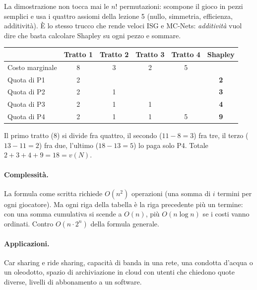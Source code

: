 \begin{osservazione}
La dimostrazione non tocca mai le $n!$ permutazioni: scompone il gioco in pezzi semplici e
usa i quattro assiomi della lezione 5 (nullo, simmetria, efficienza, additività). È lo
stesso trucco che rende veloci ISG e MC-Nets: \emph{additività} vuol dire che basta
calcolare Shapley su ogni pezzo e sommare.
\end{osservazione}

\begin{esempio}
\begin{center}
\renewcommand{\arraystretch}{1.2}
\begin{tabular}{lccccc}
\toprule
 & Tratto 1 & Tratto 2 & Tratto 3 & Tratto 4 & \textbf{Shapley} \\
\midrule
Costo marginale & 8 & 3 & 2 & 5 & \\
\midrule
Quota di P1 & 2 &   &   &   & \textbf{2} \\
Quota di P2 & 2 & 1 &   &   & \textbf{3} \\
Quota di P3 & 2 & 1 & 1 &   & \textbf{4} \\
Quota di P4 & 2 & 1 & 1 & 5 & \textbf{9} \\
\bottomrule
\end{tabular}
\end{center}
Il primo tratto ($8$) si divide fra quattro, il secondo ($11 - 8 = 3$) fra tre, il terzo
($13 - 11 = 2$) fra due, l'ultimo ($18 - 13 = 5$) lo paga solo P4. Totale
$2 + 3 + 4 + 9 = 18 = v(N)$.
\end{esempio}

\paragraph{Complessità.}
La formula come scritta richiede $O(n^2)$ operazioni (una somma di $i$ termini per ogni
giocatore). Ma ogni riga della tabella è la riga precedente più un termine: con una somma
cumulativa si scende a $O(n)$, più $O(n \log n)$ se i costi vanno ordinati. Contro
$O(n \cdot 2^n)$ della formula generale.

\paragraph{Applicazioni.}
Car sharing e ride sharing, capacità di banda in una rete, una condotta d'acqua o un
oleodotto, spazio di archiviazione in cloud con utenti che chiedono quote diverse, livelli
di abbonamento a un software.

